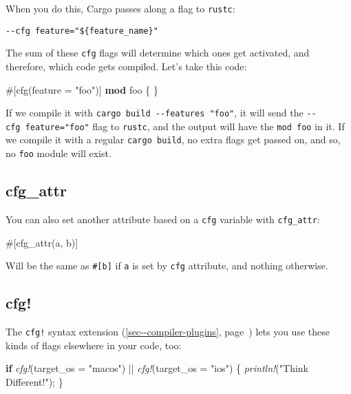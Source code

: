 \documentclass[a4paper,]{book}
\renewcommand*{\hyperref}[2][\ar]{%
  \def\ar{#2}%
  #2 (\autoref{#1}, page~\pageref{#1})}
\newenvironment{Shaded}{\begin{snugshade}}{\end{snugshade}}
\newcommand{\KeywordTok}[1]{\textcolor[rgb]{0.13,0.29,0.53}{\textbf{{#1}}}}
\newcommand{\StringTok}[1]{\textcolor[rgb]{0.31,0.60,0.02}{{#1}}}
\newcommand{\PreprocessorTok}[1]{\textcolor[rgb]{0.56,0.35,0.01}{\textit{{#1}}}}
\newcommand{\AttributeTok}[1]{\textcolor[rgb]{0.77,0.63,0.00}{{#1}}}
\newcommand{\NormalTok}[1]{{#1}}
\begin{document}
When you do this, Cargo passes along a flag to \texttt{rustc}:

\begin{verbatim}
--cfg feature="${feature_name}"
\end{verbatim}

The sum of these \texttt{cfg} flags will determine which ones get
activated, and therefore, which code gets compiled. Let's take this
code:

\begin{Shaded}
\begin{Highlighting}[]
\AttributeTok{#[}\NormalTok{cfg}\AttributeTok{(}\NormalTok{feature }\AttributeTok{=} \StringTok{"foo"}\AttributeTok{)]}
\KeywordTok{mod} \NormalTok{foo \{}
\NormalTok{\}}
\end{Highlighting}
\end{Shaded}

If we compile it with \texttt{cargo\ build\ -\/-features\ "foo"}, it
will send the \texttt{-\/-cfg\ feature="foo"} flag to \texttt{rustc},
and the output will have the \texttt{mod\ foo} in it. If we compile it
with a regular \texttt{cargo\ build}, no extra flags get passed on, and
so, no \texttt{foo} module will exist.

\subsection{cfg\_attr}\label{cfgux5fattr}

You can also set another attribute based on a \texttt{cfg} variable with
\texttt{cfg\_attr}:

\begin{Shaded}
\begin{Highlighting}[]
\AttributeTok{#[}\NormalTok{cfg_attr}\AttributeTok{(}\NormalTok{a}\AttributeTok{,} \NormalTok{b}\AttributeTok{)]}
\end{Highlighting}
\end{Shaded}

Will be the same as \texttt{\#{[}b{]}} if \texttt{a} is set by
\texttt{cfg} attribute, and nothing otherwise.

\subsection{cfg!}\label{cfg}

The \texttt{cfg!} \hyperref[sec--compiler-plugins]{syntax extension}
lets you use these kinds of flags elsewhere in your code, too:

\begin{Shaded}
\begin{Highlighting}[]
\KeywordTok{if} \PreprocessorTok{cfg!}\NormalTok{(target_os = }\StringTok{"macos"}\NormalTok{) || }\PreprocessorTok{cfg!}\NormalTok{(target_os = }\StringTok{"ios"}\NormalTok{) \{}
    \PreprocessorTok{println!}\NormalTok{(}\StringTok{"Think Different!"}\NormalTok{);}
\NormalTok{\}}
\end{Highlighting}
\end{Shaded}
\end{document}
